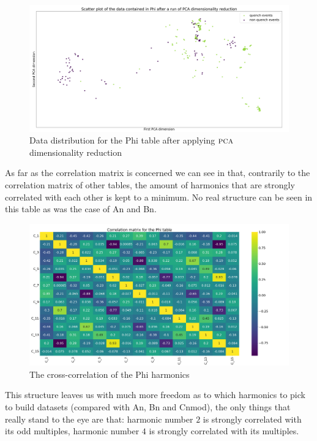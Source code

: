 \begin{figure}[h!]
	\centering
	\includegraphics[scale=.2]{img/Phi_distribution.png}
	\caption{Data distribution for the Phi table after applying $\textsc{pca}$ dimensionality
		reduction} \label{fig:phi-dist}
\end{figure}

\medskip

As far as the correlation matrix is concerned we can see in  that, contrarily to
the correlation matrix of other tables, the amount of harmonics that are strongly correlated with
each other is kept to a minimum. No real structure can be seen in this table as was the case of An
and Bn.
\begin{figure}[h!]
	\centering
	\includegraphics[scale=.2]{img/Phi_corr_matrix.png}
	\caption{The cross-correlation of the Phi harmonics} \label{fig:phi-corr}
\end{figure}
This structure leaves us with much more freedom as to which harmonics to pick to build datasets
(compared with An, Bn and Cnmod), the only things that really stand to the eye are that: harmonic
number $2$ is strongly correlated with its odd multiples, harmonic number $4$ is strongly correlated
with its multiples.

